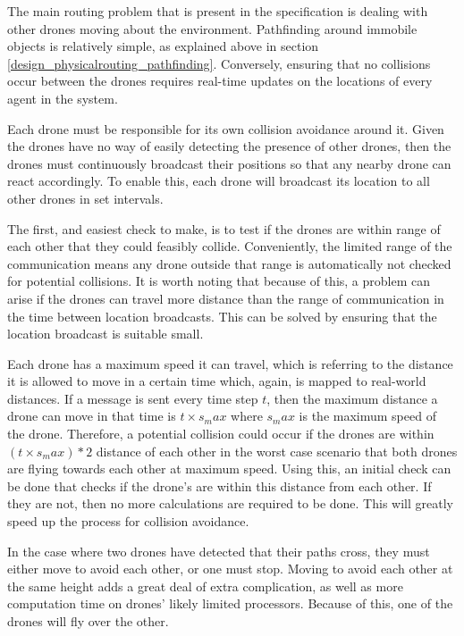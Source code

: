The main routing problem that is present in the specification is dealing with other drones moving about the environment. Pathfinding around immobile objects is relatively simple, as explained above in section \ref{design_physicalrouting_pathfinding}. Conversely, ensuring that no collisions occur between the drones requires real-time updates on the locations of every agent in the system.

Each drone must be responsible for its own collision avoidance around it. Given the drones have no way of easily detecting the presence of other drones, then the drones must continuously broadcast their positions so that any nearby drone can react accordingly. To enable this, each drone will broadcast its location to all other drones in set intervals.

The first, and easiest check to make, is to test if the drones are within range of each other that they could feasibly collide. Conveniently, the limited range of the communication means any drone outside that range is automatically not checked for potential collisions. It is worth noting that because of this, a problem can arise if the drones can travel more distance than the range of communication in the time between location broadcasts. This can be solved by ensuring that the location broadcast is suitable small.

Each drone has a maximum speed it can travel, which is referring to the distance it is allowed to move in a certain time which, again, is mapped to real-world distances. If a message is sent every time step $t$, then the maximum distance a drone can move in that time is $t \times s_max$ where $s_max$ is the maximum speed of the drone. Therefore, a potential collision could occur if the drones are within $(t \times s_max) * 2$ distance of each other in the worst case scenario that both drones are flying towards each other at maximum speed. Using this, an initial check can be done that checks if the drone's are within this distance from each other. If they are not, then no more calculations are required to be done. This will greatly speed up the process for collision avoidance.

In the case where two drones have detected that their paths cross, they must either move to avoid each other, or one must stop. Moving to avoid each other at the same height adds a great deal of extra complication, as well as more computation time on drones' likely limited processors. Because of this, one of the drones will fly over the other.

